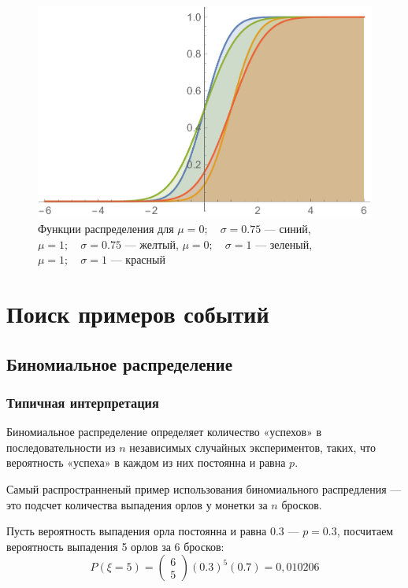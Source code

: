 \documentclass[a4paper]{article}
\begin{document}
\begin{figure}[h!]
    \centering
    \includegraphics[scale=0.5]{NormalCDF.pdf}
    \caption{Функции распределения для 	$\mu=0;\quad\sigma=0.75$ --- синий,\quad
	$\mu=1;\quad \sigma=0.75$ --- желтый,\quad
	$\mu=0;\quad \sigma=1$ --- зеленый,\quad
	$\mu=1;\quad \sigma=1$ --- красный
}
\end{figure}


\section{Поиск примеров событий}

\subsection{Биномиальное распределение}

\subsubsection{Типичная интерпретация}
Биномиальное распределение определяет количество «успехов» в последовательности из $n$ независимых случайных экспериментов, таких, что вероятность «успеха» в каждом из них постоянна и равна $p$.

Самый распространненый пример использования биномиального распредления --- это подсчет количества выпадения орлов у монетки за $n$ бросков.

Пусть вероятность выпадения орла постоянна и равна 0.3 --- $p=0.3$, посчитаем вероятность выпадения 5 орлов за 6 бросков:
$$P(\xi=5)=\left(\begin{array}{l}{6} \\ {5}\end{array}\right)(0.3)^{5}(0.7)=0,010206$$
\end{document}
